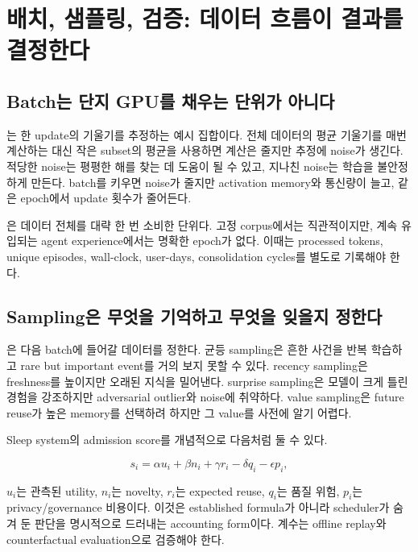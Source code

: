 \chapter{배치, 샘플링, 검증: 데이터 흐름이 결과를 결정한다}
\label{bg:chapter-batch-evaluation}

\section{Batch는 단지 GPU를 채우는 단위가 아니다}

는 한 update의 기울기를 추정하는 예시 집합이다. 전체 데이터의
평균 기울기를 매번 계산하는 대신 작은 subset의 평균을 사용하면 계산은 줄지만 추정에
noise가 생긴다. 적당한 noise는 평평한 해를 찾는 데 도움이 될 수 있고, 지나친 noise는
학습을 불안정하게 만든다. batch를 키우면 noise가 줄지만 activation memory와 통신량이
늘고, 같은 epoch에서 update 횟수가 줄어든다.

은 데이터 전체를 대략 한 번 소비한 단위다. 고정 corpus에서는
직관적이지만, 계속 유입되는 agent experience에서는 명확한 epoch가 없다. 이때는 processed
tokens, unique episodes, wall-clock, user-days, consolidation cycles를 별도로 기록해야 한다.

\section{Sampling은 무엇을 기억하고 무엇을 잊을지 정한다}

은 다음 batch에 들어갈 데이터를 정한다. 균등 sampling은
흔한 사건을 반복 학습하고 rare but important event를 거의 보지 못할 수 있다. recency
sampling은 freshness를 높이지만 오래된 지식을 밀어낸다. surprise sampling은 모델이 크게
틀린 경험을 강조하지만 adversarial outlier와 noise에 취약하다. value sampling은 future
reuse가 높은 memory를 선택하려 하지만 그 value를 사전에 알기 어렵다.

Sleep system의 admission score를 개념적으로 다음처럼 둘 수 있다.

\begin{equation}
  s_i = \alpha u_i + \beta n_i + \gamma r_i
        -\delta q_i-\epsilon p_i,
  \label{eq:bg-admission-score}
\end{equation}

$u_i$는 관측된 utility, $n_i$는 novelty, $r_i$는 expected reuse, $q_i$는 품질 위험,
$p_i$는 privacy/governance 비용이다. 이것은 established formula가 아니라 scheduler가
숨겨 둔 판단을 명시적으로 드러내는 accounting form이다. 계수는 offline replay와
counterfactual evaluation으로 검증해야 한다.

